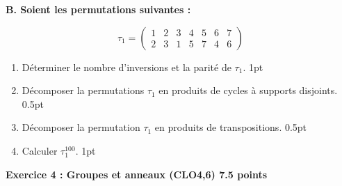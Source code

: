 \documentclass[10pt,openbib,a4paper,openright,a4paper]{article}%
\begin{document}
\textbf{B. Soient les permutations suivantes :}

\[
\tau_1 =
\begin{pmatrix}
1 & 2 & 3 & 4 & 5 & 6 & 7 \\
2 & 3 & 1 & 5 & 7 & 4 & 6
\end{pmatrix}
\]

\begin{enumerate}
\item Déterminer le nombre d’inversions et la parité de $\tau_1$. \hfill 1pt

\item Décomposer la permutations $\tau_1$ en produits de cycles à supports disjoints. \hfill 0.5pt

\item Décomposer la permutation $\tau_1$ en produits de transpositions. \hfill 0.5pt

\item Calculer $\tau_1^{100}$. \hfill 1pt
\end{enumerate}


\textbf{{\large Exercice 4 : Groupes et anneaux} (CLO4,6) 7.5 points}
\end{document}

